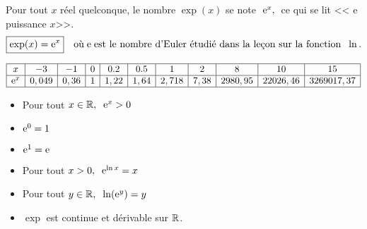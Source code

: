 \begin{notation}
Pour tout  $ x $  réel quelconque, le nombre $ \exp(x) $ se  note   $\; \mathrm{e}^{x},\;$ ce qui se lit << $ \mathrm{e} $  puissance $ x $>>. 
\[\boxed{\exp(x)=\mathrm{e}^{x}}\quad \text{où}\;\mathrm{e}\; \text{est le nombre d'Euler étudié dans la leçon sur la fonction }\;\ln. \]
\end{notation}
\begin{example} 

$$\begin{array}{|c|c|c|c|c|c|c|c|c|c|c|}
\hline
 x & -3&  -1 &  0 &  0.2  &0.5 &  1 &  2  &  8  &  10  & 15 \\
\hline
 \eexp{x}    & 0,049  & 0,36 & 1 & 1,22 & 1,64 & 2,718& 7,38 &2980,95 &22026,46 &3269017,37\\
\hline

\end{array}$$


\end{example}
\begin{corollary}
\begin{itemize}
\item[\textbullet] Pour tout  \; $ x \in \mathbb{R},\; \; \mathrm{e}^{x}> 0 $

\item[\textbullet] $  \mathrm{e}^{0}= 1 $  
\item[\textbullet] $ \mathrm{e}^{1}= \mathrm{e} $

 \item[\textbullet]  Pour tout \; $ x> 0,\; \; \mathrm{e}^{\ln x}=x  $
 
 
  \item[\textbullet]   Pour tout\;  $ y\in \mathbb{R} ,\; \; \ln (\mathrm{e}^{y})=y  $
  
  
   \item[\textbullet] $ \exp $  est continue et dérivable sur  $ \mathbb{R} $.
  
  \end{itemize}

\end{corollary}

